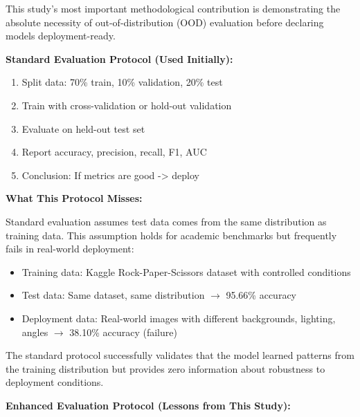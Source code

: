 \documentclass[12pt,a4paper]{article}
\begin{document}
This study's most important methodological contribution is demonstrating the absolute necessity of out-of-distribution (OOD) evaluation before declaring models deployment-ready.

\textbf{Standard Evaluation Protocol (Used Initially):}
\begin{enumerate}
    \item Split data: 70\% train, 10\% validation, 20\% test
    \item Train with cross-validation or hold-out validation
    \item Evaluate on held-out test set
    \item Report accuracy, precision, recall, F1, AUC
    \item Conclusion: If metrics are good -> deploy
\end{enumerate}

\textbf{What This Protocol Misses:}

Standard evaluation assumes test data comes from the same distribution as training data. This assumption holds for academic benchmarks but frequently fails in real-world deployment:

\begin{itemize}
    \item Training data: Kaggle Rock-Paper-Scissors dataset with controlled conditions
    \item Test data: Same dataset, same distribution $\rightarrow$ 95.66\% accuracy
    \item Deployment data: Real-world images with different backgrounds, lighting, angles $\rightarrow$ 38.10\% accuracy (failure)
\end{itemize}

The standard protocol successfully validates that the model learned patterns from the training distribution but provides zero information about robustness to deployment conditions.

\textbf{Enhanced Evaluation Protocol (Lessons from This Study):}
\end{document}
